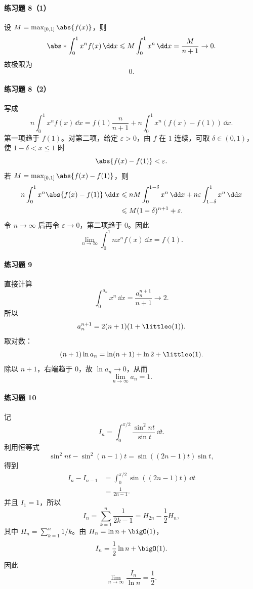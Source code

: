 \paragraph{练习题 8（1）}
\begin{xsolution}
设 $M=\max_{[0,1]}\abs{f(x)}$，则
\[
  \abs*{\int_0^1x^nf(x)\,\dd x}
  \leqslant M\int_0^1x^n\,\dd x
  =\frac{M}{n+1}\to0.
\]
故极限为
\[
  \boxed{0}.
\]
\end{xsolution}

\paragraph{练习题 8（2）}
\begin{xsolution}
写成
\[
  n\int_0^1x^nf(x)\,\dd x
  =f(1)\frac{n}{n+1}
  +n\int_0^1x^n(f(x)-f(1))\,\dd x.
\]
第一项趋于 $f(1)$。对第二项，给定 $\varepsilon>0$，由 $f$ 在 $1$ 连续，可取 $\delta\in(0,1)$，使 $1-\delta<x\leqslant1$ 时
\[
  \abs{f(x)-f(1)}<\varepsilon.
\]
若 $M=\max_{[0,1]}\abs{f(x)-f(1)}$，则
\begin{align*}
  n\int_0^1x^n\abs{f(x)-f(1)}\,\dd x
  &\leqslant nM\int_0^{1-\delta}x^n\,\dd x
  +n\varepsilon\int_{1-\delta}^1x^n\,\dd x\\
  &\leqslant M(1-\delta)^{n+1}+\varepsilon.
\end{align*}
令 $n\to\infty$ 后再令 $\varepsilon\to0$，第二项趋于 $0$。因此
\[
  \boxed{\lim_{n\to\infty}\int_0^1nx^nf(x)\,\dd x=f(1)}.
\]
\end{xsolution}

\paragraph{练习题 9}
\begin{xsolution}
直接计算
\[
  \int_0^{a_n}x^n\,\dd x=\frac{a_n^{n+1}}{n+1}\to2.
\]
所以
\[
  a_n^{n+1}=2(n+1)(1+\littleo(1)).
\]
取对数：
\[
  (n+1)\ln a_n=\ln(n+1)+\ln2+\littleo(1).
\]
除以 $n+1$，右端趋于 $0$，故 $\ln a_n\to0$，从而
\[
  \boxed{\lim_{n\to\infty}a_n=1}.
\]
\end{xsolution}

\paragraph{练习题 10}
\begin{xsolution}
记
\[
  I_n=\int_0^{\pi/2}\frac{\sin^2nt}{\sin t}\,\dd t.
\]
利用恒等式
\[
  \sin^2nt-\sin^2(n-1)t
  =\sin( (2n-1)t)\sin t,
\]
得到
\begin{align*}
  I_n-I_{n-1}
  &=\int_0^{\pi/2}\sin((2n-1)t)\,\dd t\\
  &=\frac1{2n-1}.
\end{align*}
并且 $I_1=1$，所以
\[
  I_n=\sum_{k=1}^n\frac1{2k-1}
  =H_{2n}-\frac12H_n,
\]
其中 $H_n=\sum_{k=1}^n1/k$。由 $H_n=\ln n+\bigO(1)$，
\[
  I_n=\frac12\ln n+\bigO(1).
\]
因此
\[
  \boxed{\lim_{n\to\infty}\frac{I_n}{\ln n}=\frac12}.
\]
\end{xsolution}


